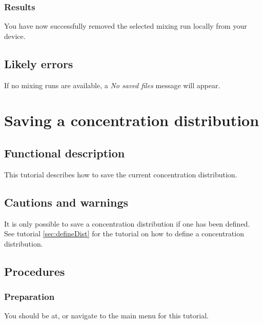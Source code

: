 \subsubsection{Results}
You have now successfully removed the selected mixing run locally from your device.

\subsection{Likely errors}
If no mixing runs are available, a \emph{No saved files} message will appear.


\section{Saving a concentration distribution}
\label{sec:savdist}

\subsection{Functional description}
This tutorial describes how to save the current concentration distribution.

\subsection{Cautions and warnings}
It is only possible to save a concentration distribution if one has been defined. See tutorial \ref{sec:defineDist} for the tutorial on how to define a concentration distribution.

\subsection{Procedures}

\subsubsection{Preparation}
You should be at, or navigate to the main menu for this tutorial.

